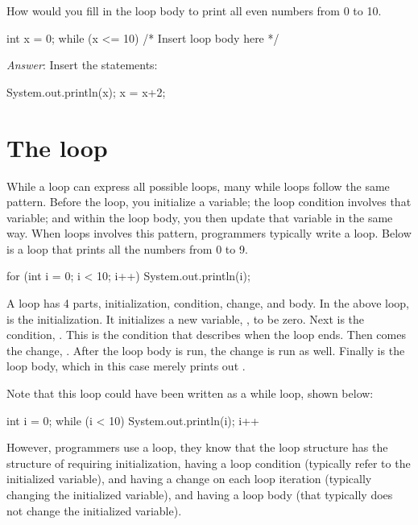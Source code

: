 \begin{example}
How would you fill in the loop body to print all even numbers from 0 to 10.

\begin{code}
int x = 0;
while (x <= 10) {
    /* Insert loop body here */
} 
\end{code}

\emph{Answer}: Insert the statements:
\begin{code}
  System.out.println(x);
  x = x+2;
\end{code}
\end{example}

\section{The  loop}
While a  loop can express all possible loops, many while loops follow the same pattern. Before the loop, you initialize a variable; the loop condition involves that variable; and within the loop body, you then update that variable in the same way. When loops involves this pattern, programmers typically write a
 loop. Below is a  loop that prints all the numbers from 0 to 9.

\begin{code}
for (int i = 0; i < 10; i++)
{
    System.out.println(i);
}
\end{code}

A  loop has 4 parts, initialization, condition, change, and body. In the above  loop,  is the initialization. It initializes a new variable, , to be zero. Next is the condition, . This is the condition that describes when the loop ends. Then comes the change, . After the loop body is run, the change is run as well.  Finally is the loop body, which in this case merely prints out .

Note that this loop could have been written as a while loop, shown below:
\begin{code}
int i = 0;
while (i < 10)  
{
    System.out.println(i);
    i++
}
\end{code}
%
However, programmers use a  loop, they know that the loop structure has the structure of requiring initialization, having a loop condition (typically refer to the initialized variable), and having a change on each loop iteration (typically changing the initialized variable), and having a loop body
(that typically does not change the initialized variable).

